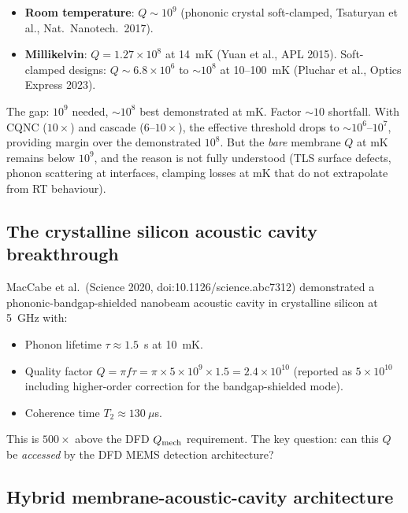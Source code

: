 \documentclass[11pt]{article}
\newcommand{\ee}[1]{\times 10^{#1}}
\newcommand{\Qmech}{Q_{\rm mech}}
\theoremstyle{definition}
\theoremstyle{remark}
\begin{document}
\begin{itemize}[nosep]
\item \textbf{Room temperature}: $Q \sim 10^9$ (phononic crystal
  soft-clamped, Tsaturyan et al., Nat.\ Nanotech.\ 2017).
\item \textbf{Millikelvin}: $Q = 1.27\ee{8}$ at 14~mK (Yuan et al.,
  APL 2015). Soft-clamped designs: $Q \sim 6.8\ee{6}$ to $\sim 10^8$
  at 10--100~mK (Pluchar et al., Optics Express 2023).
\end{itemize}

The gap: $10^9$ needed, $\sim 10^8$ best demonstrated at mK. Factor
$\sim 10$ shortfall. With CQNC ($10\times$) and cascade ($6$--$10\times$),
the effective threshold drops to $\sim 10^6$--$10^7$, providing
margin over the demonstrated $10^8$. But the \emph{bare} membrane $Q$
at mK remains below $10^9$, and the reason is not fully understood
(TLS surface defects, phonon scattering at interfaces, clamping losses
at mK that do not extrapolate from RT behaviour).

\subsection{The crystalline silicon acoustic cavity breakthrough}

MacCabe et al.\ (Science 2020, doi:10.1126/science.abc7312) demonstrated
a phononic-bandgap-shielded nanobeam acoustic cavity in crystalline
silicon at 5~GHz with:
\begin{itemize}[nosep]
\item Phonon lifetime $\tau \approx 1.5$~s at 10~mK.
\item Quality factor $Q = \pi f \tau = \pi \times 5\ee{9} \times 1.5
  = 2.4\ee{10}$ (reported as $5\ee{10}$ including higher-order
  correction for the bandgap-shielded mode).
\item Coherence time $T_2 \approx 130~\mu$s.
\end{itemize}

This is $500\times$ above the DFD $\Qmech$ requirement. The key
question: can this $Q$ be \emph{accessed} by the DFD MEMS detection
architecture?

\subsection{Hybrid membrane-acoustic-cavity architecture}
\end{document}
